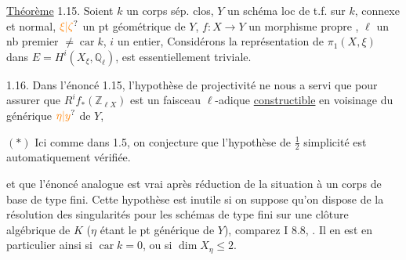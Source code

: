 \uline{Théorème} 1.15. Soient $k$ un corps sép. clos, $Y$ un schéma   loc de t.f. sur $k$,  connexe et normal, $\unsure{\xi|\zeta}$ un pt géométrique de $Y$, $f:X\longrightarrow Y$ un morphisme propre , $\ell$ un nb premier $\ne\operatorname{car} k$,  $i$ un entier,  Considérons la représentation de $\pi_1(X,\xi)$ dans $E=H^i(X_\xi,\mathbb{Q}_\ell)$,        est essentiellement triviale. 

1.16. Dans l'énoncé 1.15, l'hypothèse de projectivité ne nous a servi que pour assurer que  $R^i f_*(\mathbb{Z}_{\ell X})$ est un faisceau $\ell$-adique \uline{constructible} en voisinage du  générique $\unsure{\eta|y}$ de $Y$,

$(*)$ Ici  comme dans 1.5, on conjecture  que l'hypothèse de $\frac12$ simplicité est automatiquement vérifiée.

et que l'énoncé analogue est vrai après réduction de la situation à un corps de base de type fini. Cette hypothèse est  inutile si on suppose qu'on dispose de la résolution des singularités pour les schémas de type fini  sur une clôture algébrique de $K$ ($\eta$ étant le pt générique de $Y$),   comparez I 8.8, . Il en est en particulier ainsi si $\operatorname{car} k=0$, ou si $\dim X_\eta\leq2$.


